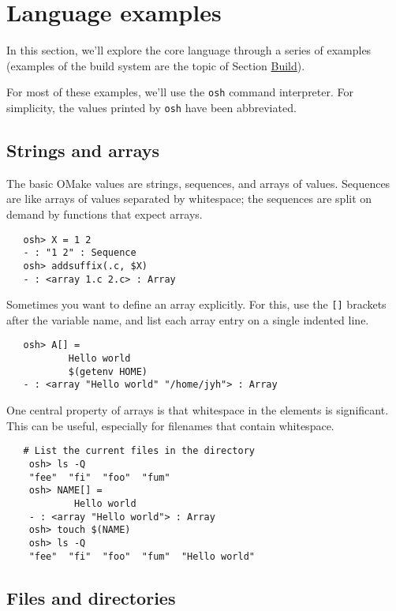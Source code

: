 %
%
\section{Language examples}

In this section, we'll explore the core language through a series of examples (examples of the build
system are the topic of Section \href{omake-build-examples#examples}{Build}).

For most of these examples, we'll use the \verb+osh+ command interpreter.  For simplicity, the
values printed by \verb+osh+ have been abbreviated.

\subsection{Strings and arrays}

The basic OMake values are strings, sequences, and arrays of values.  Sequences are like arrays of
values separated by whitespace; the sequences are split on demand by functions that expect arrays.

\begin{verbatim}
   osh> X = 1 2
   - : "1 2" : Sequence
   osh> addsuffix(.c, $X)
   - : <array 1.c 2.c> : Array
\end{verbatim}

Sometimes you want to define an array explicitly.  For this, use the \verb+[]+ brackets after the
variable name, and list each array entry on a single indented line.

\begin{verbatim}
   osh> A[] =
           Hello world
           $(getenv HOME)
   - : <array "Hello world" "/home/jyh"> : Array
\end{verbatim}

One central property of arrays is that whitespace in the elements is significant.  This can be
useful, especially for filenames that contain whitespace. 

\begin{verbatim}
   # List the current files in the directory
    osh> ls -Q
    "fee"  "fi"  "foo"  "fum"
    osh> NAME[] = 
            Hello world
    - : <array "Hello world"> : Array
    osh> touch $(NAME)
    osh> ls -Q
    "fee"  "fi"  "foo"  "fum"  "Hello world"
\end{verbatim}       

\subsection{Files and directories}


